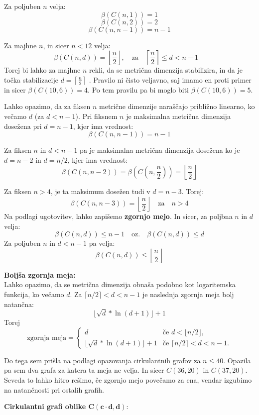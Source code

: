 \documentclass[a4paper,12pt]{article}
\theoremstyle{definition}
\theoremstyle{remark}
\theoremstyle{definition}
\begin{document}
Za poljuben $n$ velja:
\[
    \beta(C(n, 1)) = 1
\]
\[
    \beta(C(n, 2)) = 2
\]
\[
    \beta(C(n, n-1)) = n-1
\]

\noindent
Za majhne $n$, in sicer $n < 12$ velja:
\[
    \beta(C(n, d)) = \left\lfloor \frac{n}{2} \right\rfloor, \quad \text{za} \quad \left\lceil \frac{n}{2} \right\rceil \leq d < n-1 \quad
\]
\noindent
Torej bi lahko za majhne $n$ rekli, da se metrična dimenzija stabilizira, in da je točka stabilizacije $ d = \left\lceil \frac{n}{2} \right\rceil$ .
Pravilo ni čisto veljavno, saj imamo en proti primer in sicer $\beta(C(10, 6)) = 4$. Po tem pravilu pa bi moglo biti $\beta(C(10, 6)) = 5$. 
\\

\par 
\noindent
Lahko opazimo, da za fiksen $n$ metrične dimenzije naraščajo približno linearno, ko večamo $d$ (za $d < n-1$).
Pri fiksnem $n$ je maksimalna metrična dimenzija dosežena pri $d = n - 1$, kjer ima vrednost: 
\[
    \beta(C(n, n-1)) = n-1
\]

\noindent
Za fiksen $n$ in $d < n - 1$ pa je maksimalna metrična dimenzija dosežena ko je $d = n -2$ in $d = n/2$, 
kjer ima vrednost:
\[
    \beta(C(n, n-2)) = \beta\left(C\left(n, \frac{n}{2}\right)\right) = \left\lfloor \frac{n}{2} \right\rfloor
\]

\noindent
Za fiksen $n > 4$, je ta maksimum dosežen tudi v $d = n - 3$. Torej:
\[
    \beta(C(n, n-3)) = \left\lfloor \frac{n}{2} \right\rfloor \quad \text{za} \quad n > 4
\]
\noindent
Na podlagi ugotovitev, lahko zapišemo \textbf{zgornjo mejo}. In sicer, za poljbna $n$ in $d$ velja:
\[\beta(C(n,d)) \leq n - 1 \quad \text{oz.} \quad  \beta(C(n,d)) \leq d\]  
\noindent
Za poljuben $n$ in $d < n-1$ pa velja:
\[\beta(C(n ,d)) \leq \left\lfloor \frac{n}{2} \right\rfloor\]

\par
\noindent
\textbf{Boljša zgornja meja:}\\
\noindent
Lahko opazimo, da se metrična dimenzija obnaša podobno kot logaritemska funkcija, ko večamo $d$.
Za $ \lceil n/2 \rceil < d < n-1$ je naslednja zgornja meja bolj natančna:
\[ \lfloor \sqrt{d}*\ln(d + 1) \rfloor + 1  
\]
\noindent
Torej
\[
\text{zgornja meja} = 
\begin{cases} 
d & \text{če } d < \lfloor n/2 \rfloor, \\
\lfloor \sqrt{d}*\ln(d + 1) \rfloor + 1   & \text{če } \lceil n/2 \rceil < d < n-1.
\end{cases}
\]

\noindent
Do tega sem prišla na podlagi opazovanja cirkulantnih grafov za $n \leqslant 40$. 
Opazila pa sem dva grafa za katera ta meja ne velja. In sicer $C(36,20)$ in $C(37,20)$. Seveda 
to lahko hitro rešimo, če zgornjo mejo povečamo za ena, vendar izgubimo na natančnosti pri ostalih grafih.
\bigskip
\par
\noindent
\textbf{Cirkulantni grafi oblike $\mathbf{C( c\cdot d, d )}$}:
\end{document}
